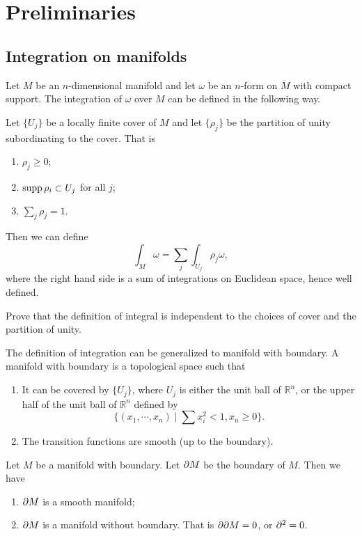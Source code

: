 \chapter{Preliminaries}
\section{Integration on manifolds} 

Let $M$ be an $n$-dimensional manifold and let $\omega$ be an $n$-form on $M$ with compact support. The integration of $\omega$ over $M$ can be defined in the following way.

Let $\{ U_j\}$ be a locally finite cover of $M$ and let $\{\rho_j\}$ be the partition of unity subordinating to the cover. That is
\begin{enumerate}
\item $\rho_j\geq 0$;
\item ${\rm supp}\,\rho_i\subset U_j$ for all $j$;
\item $\sum _j\rho_j=1$.
\end{enumerate}



Then we can define
\[
\int_M\omega=\sum_j\int_{U_j}\rho_j\omega,
\]
where the right hand side is a sum of integrations on Euclidean space, hence well defined.


\begin{ex} Prove that  the definition of integral is independent to the choices of cover and the partition of unity.
\end{ex}

The definition of integration can be generalized to manifold with boundary. A manifold with boundary  is a topological space such that
\begin{enumerate}
\item It  can be covered by  $\{U_j\}$, where $U_j$ is either the unit ball of $\mathbb R^n$, or the upper half of the unit ball of $\mathbb R^n$ defined by
\[
\{(x_1,\cdots,x_n)\mid\sum x_i^2<1,x_n\geq 0\}.
\]
\item The transition functions are smooth (up to the boundary).
\end{enumerate}

Let $M$ be a manifold with boundary. Let $\partial M$ be the boundary of $M$. Then we have
\begin{enumerate}
\item $\partial M$ is a smooth manifold;
\item $\partial M$ is a manifold without boundary. That is $\partial\partial M=0$, or $\partial^2=0$.
\end{enumerate}


